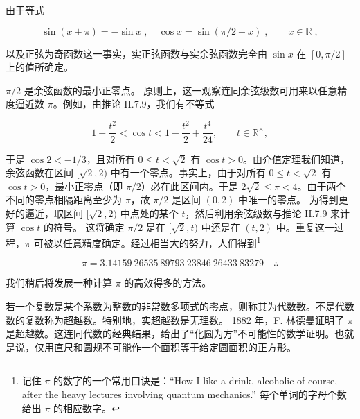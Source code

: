 \begin{remark}

\begin{items}
\item

由于等式

\[
\sin(x+\pi)=-\sin x\;,\quad\cos x=\sin(\pi/2-x)\;,\qquad x\in\mathbb{R}\;,
\]

以及正弦为奇函数这一事实，实正弦函数与实余弦函数完全由 $ \sin x $ 在 $ [0,\pi/2] $ 上的值所确定。

\end{items}


\begin{items}
\item[（b）]

$ \pi/2 $ 是余弦函数的最小正零点。
原则上，这一观察连同余弦级数可用来以任意精度逼近数 $ \pi $。例如，由推论 II.7.9，我们有不等式

\[
1-\frac{t^{2}}{2}<\cos t<1-\frac{t^{2}}{2}+\frac{t^{4}}{24},\qquad t\in\mathbb{R}^{\times},
\]

于是 $ \cos 2 < -1/3 $，且对所有 $ 0 \leq t < \sqrt{2} $ 有 $ \cos t > 0 $。由介值定理我们知道，余弦函数在区间 $ [\sqrt{2}, 2) $ 中有一个零点。事实上，由于对所有 $ 0 \leq t < \sqrt{2} $ 有 $ \cos t > 0 $，最小正零点（即 $ \pi/2 $）必在此区间内。于是 $ 2\sqrt{2} \leq \pi < 4 $。由于两个不同的零点相隔距离至少为 $ \pi $，故 $ \pi/2 $ 是区间 $ (0, 2) $ 中唯一的零点。
为得到更好的逼近，取区间 $ [\sqrt{2}, 2) $ 中点处的某个 $ t $，然后利用余弦级数与推论 II.7.9 来计算 $ \cos t $ 的符号。
这将确定 $ \pi/2 $ 是在 $ [\sqrt{2}, t) $ 中还是在 $ (t, 2) $ 中。重复这一过程，$ \pi $ 可被以任意精度确定。经过相当大的努力，人们得到\footnote{记住 $\pi$ 的数字的一个常用口诀是：“How I like a drink, alcoholic of course, after the heavy lectures involving quantum mechanics.” 每个单词的字母个数给出 $\pi$ 的相应数字。}

\[
\pi=3.14159~26535~89793~23846~26433~83279\quad\therefore
\]

我们稍后将发展一种计算 $ \pi $ 的高效得多的方法。

\item[（c）]

若一个复数是某个系数为整数的非常数多项式的零点，则称其为代数数。不是代数数的复数称为超越数。特别地，实超越数是无理数。
1882 年，F. 林德曼证明了 $ \pi $ 是超越数。这连同代数的经典结果，给出了“化圆为方”不可能性的数学证明。也就是说，仅用直尺和圆规不可能作一个面积等于给定圆面积的正方形。

\end{items}

\end{remark}


